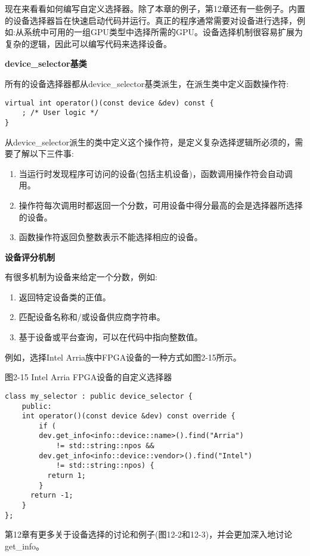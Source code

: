 现在来看看如何编写自定义选择器。除了本章的例子，第12章还有一些例子。内置的设备选择器旨在快速启动代码并运行。真正的程序通常需要对设备进行选择，例如:从系统中可用的一组GPU类型中选择所需的GPU。设备选择机制很容易扩展为复杂的逻辑，因此可以编写代码来选择设备。\par

\hspace*{\fill} \par %
\textbf{device\_selector基类}

所有的设备选择器都从device\_selector基类派生，在派生类中定义函数操作符:\par

\begin{lstlisting}[caption={}]
virtual int operator()(const device &dev) const {
	; /* User logic */
}
\end{lstlisting}

从device\_selector派生的类中定义这个操作符，是定义复杂选择逻辑所必须的，需要了解以下三件事:\par

\begin{enumerate}
	\item 当运行时发现程序可访问的设备(包括主机设备)，函数调用操作符会自动调用。
	\item 操作符每次调用时都返回一个分数，可用设备中得分最高的会是选择器所选择的设备。
	\item 函数操作符返回负整数表示不能选择相应的设备。
\end{enumerate}

\hspace*{\fill} \par %
\textbf{设备评分机制}

有很多机制为设备来给定一个分数，例如:\par

\begin{enumerate}
	\item 返回特定设备类的正值。
	\item 匹配设备名称和/或设备供应商字符串。
	\item 基于设备或平台查询，可以在代码中指向整数值。
\end{enumerate}

例如，选择Intel Arria族中FPGA设备的一种方式如图2-15所示。\par

\hspace*{\fill} \par %
图2-15 Intel Arria FPGA设备的自定义选择器
\begin{lstlisting}[caption={}]
class my_selector : public device_selector {
	public:
	int operator()(const device &dev) const override {
		if (
		dev.get_info<info::device::name>().find("Arria")
			!= std::string::npos &&
		dev.get_info<info::device::vendor>().find("Intel")
			!= std::string::npos) {
		  return 1;
		}
	  return -1;
	}
};
\end{lstlisting}

第12章有更多关于设备选择的讨论和例子(图12-2和12-3)，并会更加深入地讨论get\_info。\par



